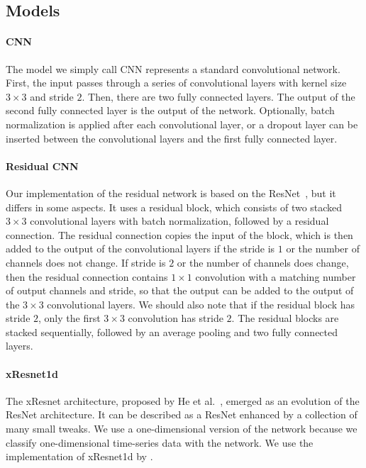 \subsection{Models}

\paragraph{CNN}
The model we simply call CNN represents a standard convolutional network. First, the input passes through a series of convolutional layers with kernel size $3\times 3$ and stride $2$. Then, there are two fully connected layers. The output of the second fully connected layer is the output of the network. Optionally, batch normalization is applied after each convolutional layer, or a dropout layer can be inserted between the convolutional layers and the first fully connected layer.

\paragraph{Residual CNN}
Our implementation of the residual network is based on the ResNet~\cite{he2016deep}, but it differs in some aspects. It uses a residual block, which consists of two stacked $3\times 3$ convolutional layers with batch normalization, followed by a residual connection. The residual connection copies the input of the block, which is then added to the output of the convolutional layers if the stride is $1$ or the number of channels does not change. If stride is $2$ or the number of channels does change, then the residual connection contains $1\times 1$ convolution with a matching number of output channels and stride, so that the output can be added to the output of the $3\times 3$ convolutional layers. We should also note that if the residual block has stride $2$, only the first $3\times 3$ convolution has stride $2$. The residual blocks are stacked sequentially, followed by an average pooling and two fully connected layers.

\paragraph{xResnet1d}
The xResnet architecture, proposed by He et al.~\cite{he2018xresnet}, emerged as an evolution of the ResNet architecture. It can be described as a ResNet enhanced by a collection of many small tweaks. We use a one-dimensional version of the network because we classify one-dimensional time-series data with the network. We use the implementation of xResnet1d by \citet{xresnet2023github}.

